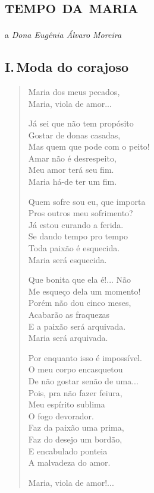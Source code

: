\chapter[\textsc{tempo da maria}I.\,Moda do corajoso]{\textsc{tempo da maria} }

\begin{flushright}
a \emph{Dona Eugênia Álvaro Moreira}
\end{flushright}

\section{I.\,Moda do corajoso}

\begin{verse}
Maria dos meus pecados,\\
Maria, viola de amor...

Já sei que não tem propósito\\
Gostar de donas casadas,\\
Mas quem que pode com o peito!\\
Amar não é desrespeito,\\
Meu amor terá seu fim.\\
Maria há-de ter um fim.

Quem sofre sou eu, que importa\\
Pros outros meu sofrimento?\\
Já estou curando a ferida.\\
Se dando tempo pro tempo\\
Toda paixão é esquecida.\\
Maria será esquecida.

Que bonita que ela é!... Não\\
Me esqueço dela um momento!\\
Porém não dou cinco meses,\\
Acabarão as fraquezas\\
E a paixão será arquivada.\\
Maria será arquivada.

Por enquanto isso é impossível.\\
O meu corpo encasquetou\\
De não gostar senão de uma...\\
Pois, pra não fazer feiura,\\
Meu espírito sublima\\
O fogo devorador.\\
Faz da paixão uma prima,\\
Faz do desejo um bordão,\\
E encabulado ponteia\\
A malvadeza do amor.

Maria, viola de amor!...
\end{verse}

